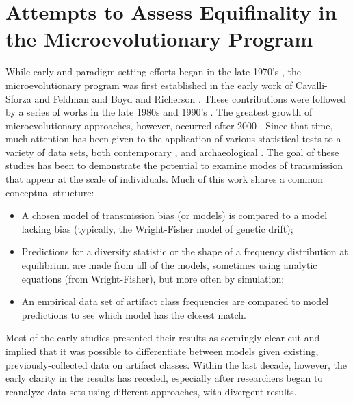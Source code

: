 \section{Attempts to Assess Equifinality in the Microevolutionary Program}

While early and paradigm setting efforts began in the late 1970's , the microevolutionary program was first established in the early work of Cavalli-Sforza and Feldman \citeyearpar{CF1981} and Boyd and Richerson \citeyearpar{BR1985}.  These contributions were followed by a series of works in the late 1980s and 1990's .  The greatest growth of microevolutionary approaches, however, occurred after 2000 .  Since that time, much attention has been given to the application of various statistical tests to a variety of data sets, both contemporary , and archaeological .  The goal of these studies has been to demonstrate the potential to examine modes of transmission that appear at the scale of individuals.  Much of this work shares a common conceptual structure:

\begin{itemize}
    \item A chosen model of transmission bias (or models) is compared to a model lacking bias (typically, the Wright-Fisher model of genetic drift);
    \item Predictions for a diversity statistic or the shape of a frequency distribution at equilibrium are made from all of the models, sometimes using analytic equations (from Wright-Fisher), but more often by simulation;
    \item An empirical data set of artifact class frequencies are compared to model predictions to see which model has the closest match.
\end{itemize}

Most of the early studies presented their results as seemingly clear-cut and implied that it was possible to differentiate between models given existing, previously-collected data on artifact classes.  Within the last decade, however, the early clarity in the results has receded, especially after researchers began to reanalyze data sets using different approaches, with divergent results.

